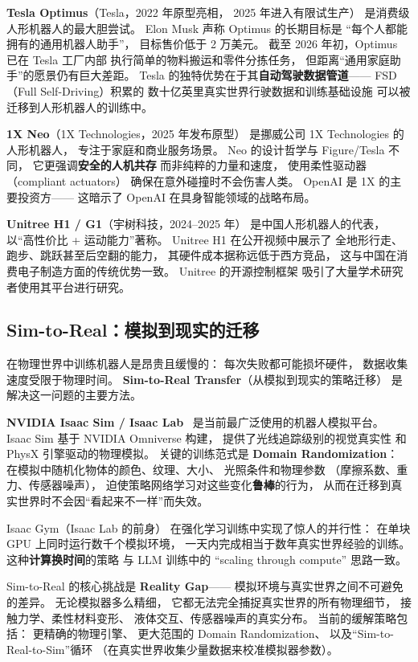 \textbf{Tesla Optimus}（Tesla，2022 年原型亮相，
2025 年进入有限试生产）
是消费级人形机器人的最大胆尝试。
Elon Musk 声称 Optimus 的长期目标是
“每个人都能拥有的通用机器人助手”，
目标售价低于 2 万美元。
截至 2026 年初，Optimus 已在 Tesla 工厂内部
执行简单的物料搬运和零件分拣任务，
但距离“通用家庭助手”的愿景仍有巨大差距。
Tesla 的独特优势在于其\textbf{自动驾驶数据管道}——
FSD（Full Self-Driving）积累的
数十亿英里真实世界行驶数据和训练基础设施
可以被迁移到人形机器人的训练中。

\textbf{1X Neo}（1X Technologies，2025 年发布原型）
是挪威公司 1X Technologies 的人形机器人，
专注于家庭和商业服务场景。
Neo 的设计哲学与 Figure/Tesla 不同，
它更强调\textbf{安全的人机共存}
而非纯粹的力量和速度，
使用柔性驱动器（compliant actuators）
确保在意外碰撞时不会伤害人类。
OpenAI 是 1X 的主要投资方——
这暗示了 OpenAI 在具身智能领域的战略布局。

\textbf{Unitree H1 / G1}（宇树科技，2024--2025 年）
是中国人形机器人的代表，
以“高性价比 + 运动能力”著称。
Unitree H1 在公开视频中展示了
全地形行走、跑步、跳跃甚至后空翻的能力，
其硬件成本据称远低于西方竞品，
这与中国在消费电子制造方面的传统优势一致。
Unitree 的开源控制框架
吸引了大量学术研究者使用其平台进行研究。

\subsection{Sim-to-Real：模拟到现实的迁移}

在物理世界中训练机器人是昂贵且缓慢的：
每次失败都可能损坏硬件，
数据收集速度受限于物理时间。
\textbf{Sim-to-Real Transfer}（从模拟到现实的策略迁移）
是解决这一问题的主要方法。

\textbf{NVIDIA Isaac Sim / Isaac Lab}~\cite{makoviychuk2021isaac}
是当前最广泛使用的机器人模拟平台。
Isaac Sim 基于 NVIDIA Omniverse 构建，
提供了光线追踪级别的视觉真实性
和 PhysX 引擎驱动的物理模拟。
关键的训练范式是 \textbf{Domain Randomization}：
在模拟中随机化物体的颜色、纹理、大小、
光照条件和物理参数
（摩擦系数、重力、传感器噪声），
迫使策略网络学习对这些变化\textbf{鲁棒}的行为，
从而在迁移到真实世界时不会因“看起来不一样”而失效。

Isaac Gym（Isaac Lab 的前身）
在强化学习训练中实现了惊人的并行性：
在单块 GPU 上同时运行数千个模拟环境，
一天内完成相当于数年真实世界经验的训练。
这种\textbf{计算换时间}的策略
与 LLM 训练中的 “scaling through compute” 思路一致。

Sim-to-Real 的核心挑战是 \textbf{Reality Gap}——
模拟环境与真实世界之间不可避免的差异。
无论模拟器多么精细，
它都无法完全捕捉真实世界的所有物理细节，
接触力学、柔性材料变形、
液体交互、传感器噪声的真实分布。
当前的缓解策略包括：
更精确的物理引擎、
更大范围的 Domain Randomization、
以及“Sim-to-Real-to-Sim”循环
（在真实世界收集少量数据来校准模拟器参数）。

